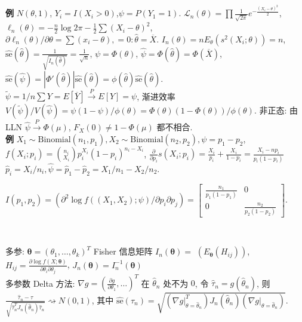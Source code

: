 \documentclass[a4paper, landscape,10pt]{article}
\begin{document}
\begin{multicols}{4}
\begin{scriptsize}
{\bfseries 例} $N(\theta, 1)$, $Y_i = I(X_i > 0)$,$\psi = P(Y_1 = 1)$.
$\mathcal{L}_n(\theta) = \prod \frac{1}{\sqrt{2\pi}} e^{-\frac{(X_i - \theta)^2}{2}}$,
$\ell_n(\theta) = -\frac{n}{2} \log 2\pi - \frac{1}{2} \sum (X_i - \theta)^2$,
$\partial \ell_n(\theta) / \partial \theta = \sum (x_i - \theta), = 0 : \hat \theta = \overline X$.
$I_n(\theta) = n E_\theta(s^2(X_i; \theta)) = n$,
$\hat{\mathrm{se}}(\hat \theta) = \frac{1}{\sqrt{I_n(\hat \theta)}} = \frac{1}{\sqrt{n}}$,
$\psi = \Phi(\theta)$, $\hat \psi = \Phi(\hat \theta) = \Phi(\overline X)$,
$\hat{\mathrm{se}}(\hat \psi) = |\Phi'(\hat \theta)| \hat{\mathrm{se}}(\hat \theta) = \phi(\hat \theta) \hat{\mathrm{se}}(\hat \theta)$.\\
$\tilde \psi = 1/n \sum Y = E[\overline Y] \xrightarrow{P} E[Y] = \psi$, 渐进效率 $V(\tilde \psi) / V(\hat \psi) = \psi (1 - \psi) / \phi(\theta) = \Phi(\theta) (1 - \Phi(\theta)) / \phi(\theta)$. 
非正态: 由 LLN $\hat \psi \xrightarrow{P} \Phi(\mu)$, $F_X(0) \neq 1 - \Phi(\mu)$ 都不相合. \\
{\bfseries 例} $X_1 \sim \mathrm{Binomial}(n_1, p_1), X_2 \sim \mathrm{Binomial}(n_2, p_2), \psi = p_1 - p_2$,
$f(X_i; p_i) = \binom{n_i}{X_i} p_i^{X_i} (1 - p_i)^{n_i - X_i}$,
$\frac {\partial} {\partial p_i} s(X_i; p_i) = \frac {X_i} {p_i} + \frac {X_i} {1 - p_i} = \frac {X_i - n p_i } {p_i (1 - p_i)}$
$\hat p_i = X_i / n_i, \hat \psi = \hat p_1 - \hat p_2 = X_1/n_1 - X_2 / n_2$.
\end{scriptsize}
\begin{tiny}
$I(p_1, p_2) = (\partial ^ 2 \log f((X_1, X_2); \psi) / \partial p_i \partial p_j) = \begin{bmatrix}
	\frac{n_1}{p_1(1 - p_1)} & 0\\
	0 & \frac{n_2}{p_2(1 - p_2)}
	\end{bmatrix}. $
\end{tiny} \\
\begin{scriptsize}
多参: $\mathbf{\theta} = (\theta_1, \dots, \theta_k)^T$ 
Fisher 信息矩阵 $I_n(\mathbf{\theta}) = $ $(E_{\mathbf{\theta}}(H_{ij}))$,
$ H_{ij} = \frac{\partial \log f(X; \mathbf{\theta})}{\partial \theta_i \partial \theta_j}$,
$J_n(\mathbf{\theta}) = I_n^{-1}(\mathbf{\theta})$\\
多参数 Delta 方法: $\nabla g = (\frac{\partial g}{\partial \theta_1}, \dots)^T$ 在 $\hat \theta_n$ 处不为 $0$, 令 $\hat \tau_n = g(\hat \theta_n)$, 则
$\frac {\hat \tau_n - \tau} {\sqrt{\hat \tau_n^T J_n(\hat \theta_n) \hat \tau_n}} \rightsquigarrow N(0, 1)$,
其中 $\hat {\mathrm{se}}(\hat \tau_n) = \sqrt{(\nabla g |_{\theta = \hat \theta_n}^T) J_n(\hat \theta_n) (\nabla g |_{\theta = \hat \theta_n})}$. \\

\end{scriptsize}
\end{multicols}
\end{document}
